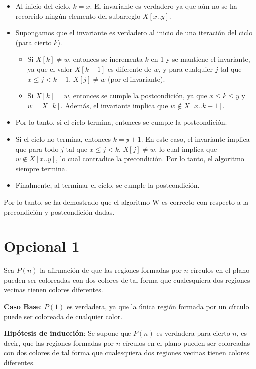 \documentclass{article}
\begin{document}
    \begin{itemize}
      \item Al inicio del ciclo, $k=x$. El invariante es verdadero ya que aún no se ha recorrido ningún elemento del subarreglo $X[x..y]$.
      \item Supongamos que el invariante es verdadero al inicio de una iteración del ciclo (para cierto $k$).
      \begin{itemize}
        \item Si $X[k] \neq w$, entonces se incrementa $k$ en 1 y se mantiene el invariante, ya que el valor $X[k-1]$ es diferente de $w$, y para cualquier $j$ tal que $x \leq j < k-1$, $X[j] \neq w$ (por el invariante).
        \item Si $X[k] = w$, entonces se cumple la postcondición, ya que $x \leq k \leq y$ y $w = X[k]$. Además, el invariante implica que $w \notin X[x..k-1]$.
      \end{itemize}
      \item Por lo tanto, si el ciclo termina, entonces se cumple la postcondición.
      \item Si el ciclo no termina, entonces $k = y+1$. En este caso, el invariante implica que para todo $j$ tal que $x \leq j < k$, $X[j] \neq w$, lo cual implica que $w \notin X[x..y]$, lo cual contradice la precondición. Por lo tanto, el algoritmo siempre termina.
      \item Finalmente, al terminar el ciclo, se cumple la postcondición.
      \end{itemize}

    Por lo tanto, se ha demostrado que el algoritmo W es correcto con respecto a la precondición y postcondición dadas.




\newpage
   \section{Opcional 1}

  Sea $P(n)$ la afirmación de que las regiones formadas por $n$ círculos en el plano pueden ser coloreadas con dos colores de tal forma
  que cualesquiera dos regiones vecinas tienen colores diferentes.

  \textbf{Caso Base}: $P(1)$ es verdadera, ya que la única región formada por un círculo puede ser coloreada de cualquier color.

  \textbf{Hipótesis de inducción}: Se supone que $P(n)$ es verdadera para cierto $n$, es decir, que las regiones formadas por $n$ círculos en
  el plano pueden ser coloreadas con dos colores de tal forma que cualesquiera dos regiones vecinas tienen colores diferentes.
\end{document}
